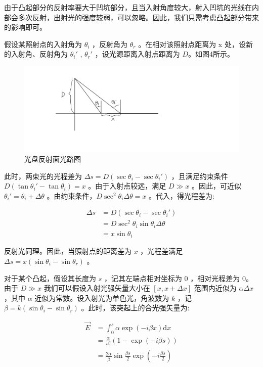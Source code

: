 \documentclass[fontset=windows]{article}
\begin{document}
由于凸起部分的反射率要大于凹坑部分，且当入射角度较大，射入凹坑的光线在内部会多次反射，出射光的强度较弱，可以忽略。因此，我们只需考虑凸起部分带来的影响即可。

假设某照射点的入射角为 $\theta_i$ ，反射角为 $\theta_r$ 。在相对该照射点距离为 x 处，设新的入射角、反射角为 $\theta_i'$ , $\theta_r'$ ，设光源距离入射点距离为 $D$。如图4所示。

\begin{figure}[htbp]
	\centering
	\includegraphics[scale=0.2]{3.png}
	\caption{光盘反射面光路图}
	\label{4}
\end{figure}

此时，两束光的光程差为 $\Delta s = D(\sec\theta_i - \sec\theta_i')$ ，且满足约束条件 $D(\tan\theta_i'-\tan\theta_i) = x$ 。由于入射点较远，满足 $D \gg x$ 。因此，可近似 $\theta_i' = \theta_i + \Delta\theta$ 。由约束条件，$D\sec^2\theta_i \Delta\theta = x$ 。代入，得光程差为:

$$
\begin{aligned}
    \Delta s &= D(\sec\theta_i - \sec\theta_i')\\
             &= D\sec^2\theta_i \sin\theta_i \Delta\theta \\
             &= x\sin\theta_i
\end{aligned}
$$

反射光同理。因此，当照射点的距离差为 $x$ ，光程差满足 $\Delta s = x(\sin\theta_i - \sin\theta_r)$ 。

对于某个凸起，假设其长度为 $s$ ，记其左端点相对坐标为 0 ，相对光程差为 0。由于 $D \gg x$ 我们可以假设入射光强矢量大小在 $[x,x+\Delta x]$ 范围内近似为 $\alpha \Delta x$ ，其中 $\alpha $ 近似为常数。设入射光为单色光，角波数为 $k$ ，记 $\beta = k(\sin\theta_i - \sin\theta_r)$ 。此时，该突起上的合光强矢量为:

$$
\begin{aligned}
    \vec{E} &= \int_0^s{\alpha \exp(-i\beta x) \mathrm{d}x} \\
            &= \frac{\alpha}{i \beta}(1 - \exp(-i\beta s))  \\
            &= \frac{2\alpha}{\beta}\sin \frac{\beta s}{2}\exp(-i\frac{\beta s}{2})
\end{aligned}
$$
\end{document}
